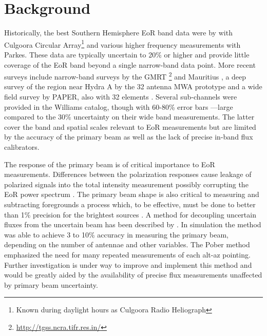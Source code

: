 \documentclass[preprint]{aastex}
\begin{document}
\section{Background}
\label{sec:background}

Historically, the best Southern Hemisphere 
EoR band data were by \citet{Slee:1995p7541} with Culgoora Circular
Array\footnote{Known during daylight hours as Culgoora Radio Heliograph} and
various higher frequency measurements with Parkes.  These data are typically
uncertain to 20\% or higher and provide little coverage of the EoR band beyond
a single narrow-band data point. 
More recent surveys include narrow-band surveys by the GMRT \footnote{\url{http://tgss.ncra.tifr.res.in/}} and Mauritius \citep{Pandey:2005p8687}, a
deep survey of the region near Hydra A by the 32 antenna MWA prototype
\cite{Williams:2012p8768} and a wide field survey by PAPER, also with 32
elements \cite{Jacobs:2011p8438}. Several sub-channels were provided in the
Williams catalog, though with 60-80\% error bars ---large compared to the 30\%
uncertainty on their wide band measurements.  The latter cover the band and
spatial scales relevant to EoR measurements but are limited by the accuracy of
the primary beam \citep{Jacobs:2013p9908} as well as the lack of precise in-band flux calibrators.

The response of the primary beam is of critical importance to EoR measurements.
Differences between the polarization responses cause leakage of polarized
signals into the total intensity measurement possibly corrupting the 
EoR power spectrum \citep{Moore:2013p9621}.  The primary beam 
shape is also critical to measuring and subtracting foregrounds 
\cite{Bernardi:2012p9020,Sullivan:2012p9457,Morales:2012p8790} a process which, to be effective, must be done to better than 1\%
precision for the brightest sources \citet{Liu:2009p4762,Bowman:2009p7816} .
A method for decoupling uncertain fluxes from the uncertain beam has been
described by \citet{Pober:2012p8800}. In simulation the method was able to
achieve 3 to 10\% accuracy in measuring the primary beam, depending on the
number of antennae and other variables. The Pober method emphasized the need
for many repeated measurements of each alt-az pointing. Further investigation
is under way to improve and implement this method and would be greatly aided by
the availability of precise flux measurements unaffected by primary beam
uncertainty. 
\end{document}
